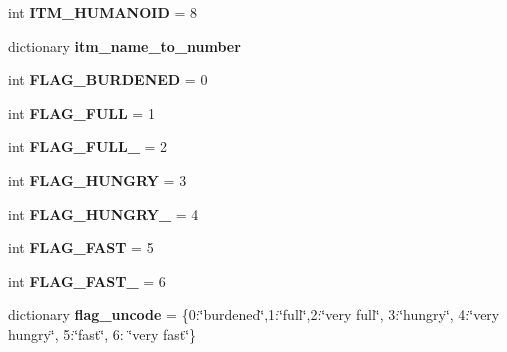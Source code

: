 \begin{DoxyCompactItemize}
\item 
\hypertarget{namespaceconstants_af7f659bc14a7a3d13856a61dcf8d6517}{}int {\bfseries I\+T\+M\+\_\+\+H\+U\+M\+A\+N\+O\+I\+D} = 8\label{namespaceconstants_af7f659bc14a7a3d13856a61dcf8d6517}

\item 
dictionary {\bfseries itm\+\_\+name\+\_\+to\+\_\+number}
\item 
\hypertarget{namespaceconstants_ab50bbb24fb0b8f5d2b62cf97c8ae3f95}{}int {\bfseries F\+L\+A\+G\+\_\+\+B\+U\+R\+D\+E\+N\+E\+D} = 0\label{namespaceconstants_ab50bbb24fb0b8f5d2b62cf97c8ae3f95}

\item 
\hypertarget{namespaceconstants_a4fd1ef34d9b902cf4386539348595c5b}{}int {\bfseries F\+L\+A\+G\+\_\+\+F\+U\+L\+L} = 1\label{namespaceconstants_a4fd1ef34d9b902cf4386539348595c5b}

\item 
\hypertarget{namespaceconstants_a94feecc4b64ec2b63c99bfb4031e85b8}{}int {\bfseries F\+L\+A\+G\+\_\+\+F\+U\+L\+L\+\_} = 2\label{namespaceconstants_a94feecc4b64ec2b63c99bfb4031e85b8}

\item 
\hypertarget{namespaceconstants_a8c95e460963ecf79096c74a5831b7723}{}int {\bfseries F\+L\+A\+G\+\_\+\+H\+U\+N\+G\+R\+Y} = 3\label{namespaceconstants_a8c95e460963ecf79096c74a5831b7723}

\item 
\hypertarget{namespaceconstants_ac9aba9bb8e6618e5fdfef3879398586f}{}int {\bfseries F\+L\+A\+G\+\_\+\+H\+U\+N\+G\+R\+Y\+\_} = 4\label{namespaceconstants_ac9aba9bb8e6618e5fdfef3879398586f}

\item 
\hypertarget{namespaceconstants_a7409aec475529a6d50549ddfa2de579f}{}int {\bfseries F\+L\+A\+G\+\_\+\+F\+A\+S\+T} = 5\label{namespaceconstants_a7409aec475529a6d50549ddfa2de579f}

\item 
\hypertarget{namespaceconstants_a0338d374252f6186651b01b0f13dda62}{}int {\bfseries F\+L\+A\+G\+\_\+\+F\+A\+S\+T\+\_} = 6\label{namespaceconstants_a0338d374252f6186651b01b0f13dda62}

\item 
\hypertarget{namespaceconstants_a8bee061f30ac8275372eb00d04fbe980}{}dictionary {\bfseries flag\+\_\+uncode} = \{0\+:\char`\"{}burdened\char`\"{},1\+:\char`\"{}full\char`\"{},2\+:\char`\"{}very full\char`\"{}, 3\+:\char`\"{}hungry\char`\"{}, 4\+:\char`\"{}very hungry\char`\"{}, 5\+:\char`\"{}fast\char`\"{}, 6\+: \char`\"{}very fast\char`\"{}\}\label{namespaceconstants_a8bee061f30ac8275372eb00d04fbe980}


\end{DoxyCompactItemize}
